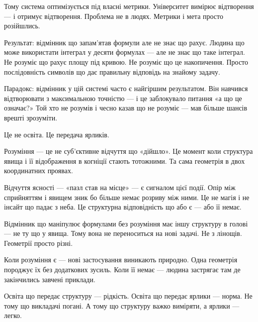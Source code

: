 \documentclass[12pt, a4paper, openany]{book}
\begin{document}
Тому система оптимізується під власні метрики. Університет вимірює відтворення --- і отримує відтворення. Проблема не в людях. Метрики і мета просто розійшлись.

Результат: відмінник що запам'ятав формули але не знає що рахує. Людина що може використати інтеграл у десяти формулах --- але не знає що таке інтеграл. Не розуміє що рахує площу під кривою. Не розуміє що це накопичення. Просто послідовність символів що дає правильну відповідь на знайому задачу.

Парадокс: відмінник у цій системі часто є найгіршим результатом. Він навчився відтворювати з максимальною точністю --- і це заблокувало питання «а що це означає?» Той хто не розумів і чесно казав що не розуміє --- мав більше шансів врешті зрозуміти.

Це не освіта. Це передача ярликів.

Розуміння --- це не суб'єктивне відчуття що «дійшло». Це момент коли структура явища і її відображення в когніції стають тотожними. Та сама геометрія в двох координатних проявах.

Відчуття ясності --- «пазл став на місце» --- є сигналом цієї події. Опір між сприйняттям і явищем зник бо більше немає розриву між ними. Це не магія і не інсайт що падає з неба. Це структурна відповідність що або є --- або її немає.

Відмінник що маніпулює формулами без розуміння має іншу структуру в голові --- не ту що у явища. Тому вона не переноситься на нові задачі. Не з лінощів. Геометрії просто різні.

Коли розуміння є --- нові застосування виникають природно. Одна геометрія породжує їх без додаткових зусиль. Коли її немає --- людина застрягає там де закінчились завчені приклади.

Освіта що передає структуру --- рідкість. Освіта що передає ярлики --- норма. Не тому що викладачі погані. А тому що структуру важко виміряти, а ярлики --- легко.
\end{document}
